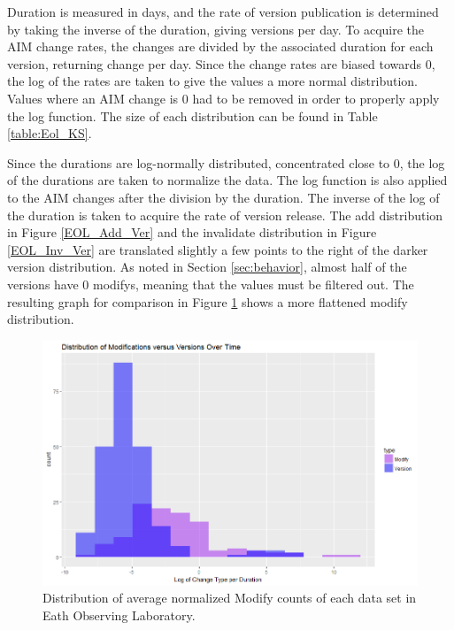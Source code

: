 Duration is measured in days, and the rate of version publication is determined by taking the inverse of the duration, giving versions per day.  
To acquire the \gls{AIM} change rates, the \glspl{change} are divided by the associated duration for each \gls{version}, returning change per day.  
Since the change rates are biased towards 0, the log of the rates are taken to give the values a more normal distribution.  
Values where an \gls{AIM} change is 0 had to be removed in order to properly apply the log function.  
The size of each distribution can be found in Table \ref{table:Eol_KS}.

Since the durations are log-normally distributed, concentrated close to 0, the log of the durations are taken to normalize the data.  
The log function is also applied to the \gls{AIM} changes after the division by the duration.  
The inverse of the log of the duration is taken to acquire the rate of \gls{version} release.
The \gls{add} distribution in Figure \ref{EOL_Add_Ver} and the \gls{invalidate} distribution in Figure \ref{EOL_Inv_Ver} are translated slightly a few points to the right of the darker \gls{version} distribution.
As noted in Section \ref{sec:behavior}, almost half of the \glspl{version} have 0 \glspl{modify}, meaning that the values must be filtered out.
The resulting graph for comparison in Figure \ref{EOL_Mod_Ver} shows a more flattened \gls{modify} distribution.
\begin{figure}[b]
	\centering
	\includegraphics[scale=.6]{figures/Eol_Mod_Ver_Rate.png}
	\caption{Distribution of average normalized Modify counts of each data set in Eath Observing Laboratory.}
	\label{EOL_Mod_Ver}
\end{figure}

